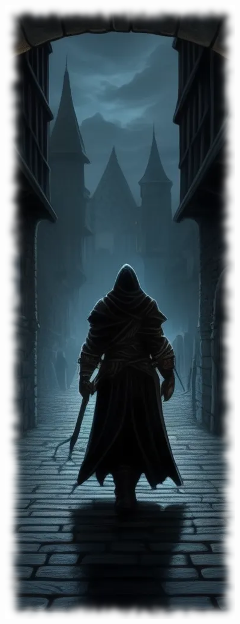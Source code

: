 \begin{figure}
\begin{center}
\includegraphics[scale=0.64]{img/ai-images/thief.png}
\end{center}
\end{figure}
